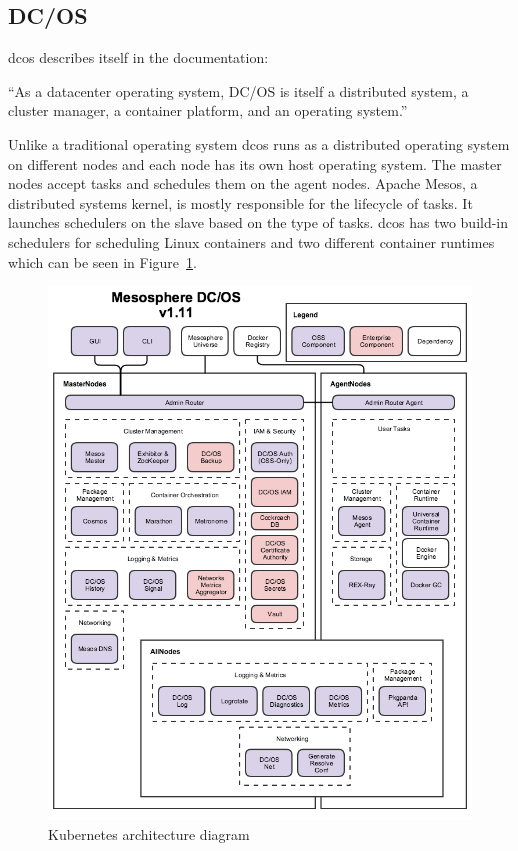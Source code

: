 \subsection{DC/OS}
\Gls{dcos} describes itself in the documentation\cite{dcos_what}: 
\begin{displayquote}
``As a datacenter operating system, DC/OS is itself a distributed system, a cluster manager, a container platform, and an operating system.''
\end{displayquote} 
Unlike a traditional operating system \gls{dcos} runs as a distributed operating system on different nodes and each node has its own host operating system. The master nodes accept tasks and schedules them on the agent nodes. Apache Mesos\cite{apache_mesos}, a distributed systems kernel, is mostly responsible for the lifecycle of tasks. It launches schedulers on the slave based on the type of tasks. \Gls{dcos} has two build-in schedulers for scheduling Linux containers and two different container runtimes which can be seen in Figure~\ref{fig:dcos-arch}.

\begin{figure}
    \centering
    \includegraphics[width=0.8\columnwidth]{images/dcos-arch}
    \caption{Kubernetes architecture diagram\cite{dcos_arch}}
    \label{fig:dcos-arch}
\end{figure}

